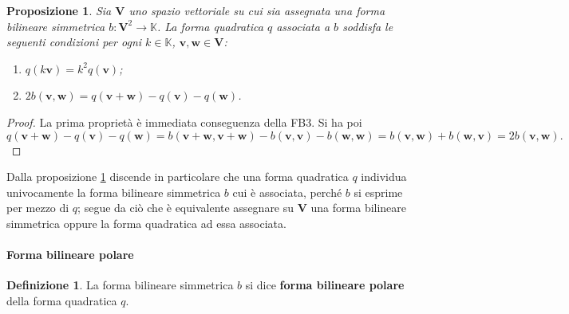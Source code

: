 \documentclass{article}
\theoremstyle{plain}
\newtheorem{prop}[thm]{Proposizione}
\theoremstyle{definition}
\newtheorem{defn}{Definizione}[section]
\theoremstyle{remark}
\begin{document}
\begin{bxthm}
\begin{prop}\label{quindiciotto}
Sia $\mathbf{V}$ uno spazio vettoriale su cui sia assegnata una forma bilineare simmetrica $b: \mathbf{V}^2 \to \mathbb{K}$. 
La forma quadratica $q$ associata a $b$ soddisfa le seguenti condizioni per ogni $k \in \mathbb{K}$, $\mathbf{v}, \mathbf{w} \in \mathbf{V}$:
\begin{enumerate}
\item $q(k\mathbf{v}) = k^2 q(\mathbf{v})$;
\item $2b(\mathbf{v}, \mathbf{w}) = q(\mathbf{v} + \mathbf{w}) - q(\mathbf{v}) - q(\mathbf{w})$.
\end{enumerate}
\end{prop}
\end{bxthm}
\begin{proof}
La prima proprietà è immediata conseguenza della FB3. Si ha poi
\[q(\mathbf{v} + \mathbf{w}) - q(\mathbf{v}) - q(\mathbf{w}) = b(\mathbf{v} + \mathbf{w}, \mathbf{v} + \mathbf{w}) - b(\mathbf{v}, \mathbf{v}) - b(\mathbf{w}, \mathbf{w}) = b(\mathbf{v}, \mathbf{w}) + b(\mathbf{w}, \mathbf{v}) = 2b(\mathbf{v}, \mathbf{w}).\]    
\end{proof}

\vspace{10pt}

Dalla proposizione \ref{quindiciotto} discende in particolare che una forma quadratica $q$ 
individua univocamente la forma bilineare simmetrica $b$ cui è associata, perché $b$ si esprime 
per mezzo di $q$; segue da ciò che è equivalente assegnare su $\mathbf{V}$ una forma bilineare simmetrica 
oppure la forma quadratica ad essa associata. 

\vspace{10pt}

\paragraph{Forma bilineare polare}
\begin{bxthm}
\begin{defn}
La forma bilineare simmetrica $b$ si dice \textbf{forma bilineare polare} della forma quadratica $q$.    
\end{defn}
\end{bxthm}

\vspace{10pt}
\end{document}
